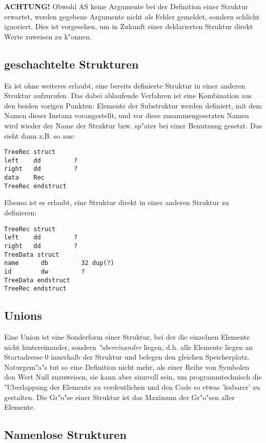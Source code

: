 \documentclass[12pt,a4paper,twoside]{report}
\begin{document}
{{\bf ACHTUNG!} Obwohl AS keine Argumente bei der Definition einer Struktur
erwartet, werden gegebene Argumente nicht als Fehler gemeldet, sondern
schlicht ignoriert.  Dies ist vorgesehen, um in Zukunft einer deklarierten
Struktur direkt Werte zuweisen zu k"onnen.

\subsection{geschachtelte Strukturen}

Es ist ohne weiteres erlaubt, eine bereits definierte Struktur in einer
anderen Struktur aufzurufen.  Das dabei ablaufende Verfahren ist eine
Kombination aus den beiden vorigen Punkten: Elemente der Substruktur
werden definiert, mit dem Namen dieser Instanz vorangestellt, und vor
diese zusammengesetzten Namen wird wieder der Name der Struktur bzw.
sp"ater bei einer Benutzung gesetzt.  Das sieht dann z.B. so aus:
\begin{verbatim}
TreeRec struct
left    dd         ?
right   dd         ?
data    Rec
TreeRec endstruct
\end{verbatim} 

Ebenso ist es erlaubt, eine Struktur direkt in einer anderen
Struktur zu definieren:
\begin{verbatim}
TreeRec struct  
left    dd         ?
right   dd         ?
TreeData struct
name      db         32 dup(?)
id        dw         ?
TreeData endstruct
TreeRec endstruct
\end{verbatim}   
  

\subsection{Unions}

Eine Union ist eine Sonderform einer Struktur, bei der die einzelnen
Elemente nicht hintereinander, sondern {\em "ubereinander} liegen, d.h. 
alle Elemente liegen an Startadresse 0 innerhalb der Struktur und belegen
den gleichen Speicherplatz.  Naturgem"a"s tut so eine Definition nicht
mehr, als einer Reihe von Symbolen den Wert Null zuzuweisen, sie kann aber
sinnvoll sein, um programmtechnisch die "Uberlappung der Elemente zu
verdeutlichen und den Code so etwas 'lesbarer' zu gestalten.  Die Gr"o"se
einer Struktur ist das Maximum der Gr"o"sen aller Elemente.

\subsection{Namenlose Strukturen}

}
\end{document}
